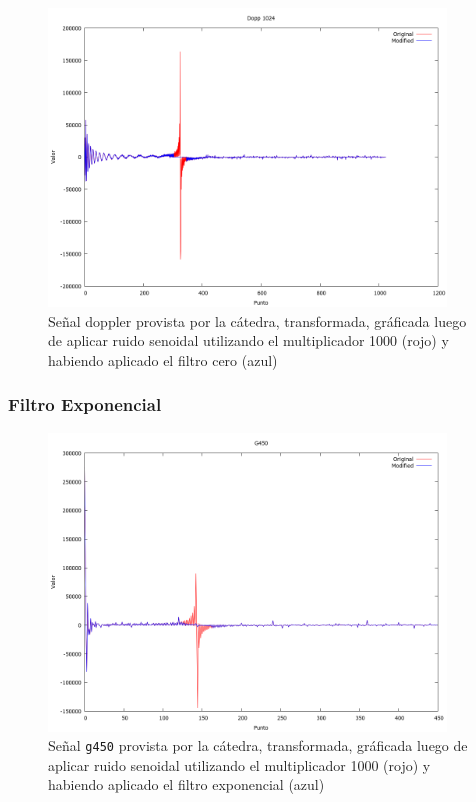 \begin{figure}[H]
\begin {center}
\includegraphics[width=299pt]{imagenes/dopp1024-sin100-zero-spec.png}
\end {center}
\caption{Se\~nal doppler provista por la c\'atedra, transformada, gr\'aficada
luego de aplicar ruido senoidal utilizando el multiplicador 1000 (rojo) y 
habiendo aplicado el filtro cero (azul)}
\label{fig:Dopp1024zero}
\end{figure}


\subsubsection{Filtro Exponencial}



\begin{figure}[H]
\begin {center}
\includegraphics[width=299pt]{imagenes/g450-sin100-exp-spec.png}
\end {center}
\caption{Se\~nal \texttt{g450} provista por la c\'atedra, transformada, gr\'aficada
luego de aplicar ruido senoidal utilizando el multiplicador 1000 (rojo) y 
habiendo aplicado el filtro exponencial (azul)}
\label{fig:GexpSpec}
\end{figure}

